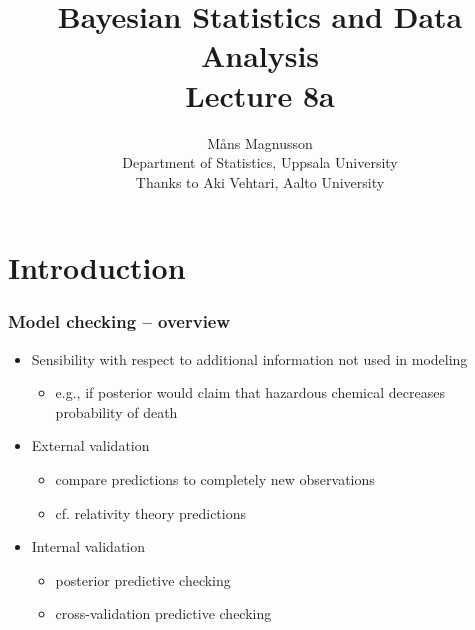 \documentclass[10pt,handout]{beamer}
\title[]{{\color{black}Bayesian Statistics and Data Analysis \\ Lecture 8a}}
\author[]{M{\aa}ns Magnusson \\ Department of Statistics, Uppsala University \\ Thanks to Aki Vehtari, Aalto University}
\date{}
\begin{document}
\frame{\titlepage
}



\section{Introduction}
\frame{\sectionpage}



 \begin{frame}

\frametitle{Model checking -- overview}

  \begin{itemize}
  \item<+-> Sensibility with respect to additional information not used in modeling
    \begin{itemize}
    \item e.g., if posterior would claim that hazardous chemical
      decreases probability of death
    \end{itemize}
  \item<+-> External validation
    \begin{itemize}
    \item compare predictions to completely new observations
    \item cf. relativity theory predictions
    \end{itemize}
  \item<+-> Internal validation
    \begin{itemize}
    \item posterior predictive checking
    \item cross-validation predictive checking
    \end{itemize}
  \end{itemize}

\end{frame}
\end{document}
